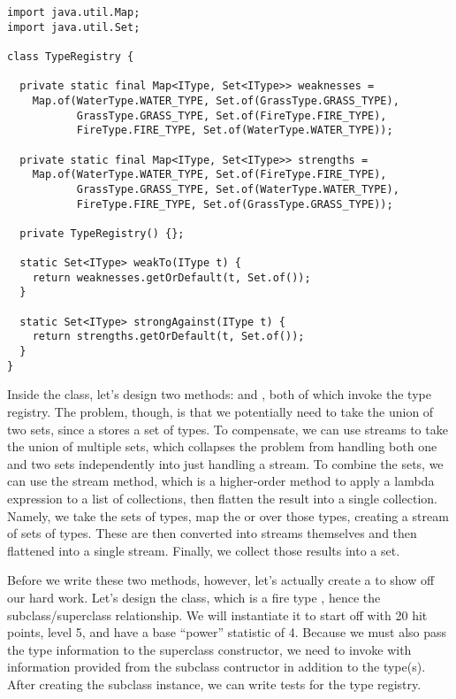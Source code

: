 \begin{lstlisting}[language=MyJava]
import java.util.Map;
import java.util.Set;

class TypeRegistry {

  private static final Map<IType, Set<IType>> weaknesses =
    Map.of(WaterType.WATER_TYPE, Set.of(GrassType.GRASS_TYPE),
           GrassType.GRASS_TYPE, Set.of(FireType.FIRE_TYPE),
           FireType.FIRE_TYPE, Set.of(WaterType.WATER_TYPE));

  private static final Map<IType, Set<IType>> strengths =
    Map.of(WaterType.WATER_TYPE, Set.of(FireType.FIRE_TYPE),
           GrassType.GRASS_TYPE, Set.of(WaterType.WATER_TYPE),
           FireType.FIRE_TYPE, Set.of(GrassType.GRASS_TYPE));

  private TypeRegistry() {};

  static Set<IType> weakTo(IType t) {
    return weaknesses.getOrDefault(t, Set.of());
  }

  static Set<IType> strongAgainst(IType t) {
    return strengths.getOrDefault(t, Set.of());
  }
}
\end{lstlisting}

Inside the  class, let's design two methods:  and , both of which invoke the type registry. The problem, though, is that we potentially need to take the union of two sets, since a  stores a set of types. To compensate, we can use streams to take the union of multiple sets, which collapses the problem from handling both one and two sets independently into just handling a stream. To combine the sets, we can use the  stream method, which is a higher-order method to apply a lambda expression to a list of collections, then flatten the result into a single collection. Namely, we take the sets of types, map the  or  over those types, creating a stream of sets of types. These are then converted into streams themselves and then flattened into a single stream. Finally, we collect those results into a set. 

Before we write these two methods, however, let's actually create a  to show off our hard work. Let's design the  class, which is a fire type , hence the subclass/superclass relationship. We will instantiate it to start off with 20 hit points, level 5, and have a base ``power'' statistic of 4. Because we must also pass the type information to the superclass constructor, we need to invoke  with information provided from the subclass contructor in addition to the type(s). After creating the subclass instance, we can write tests for the type registry. 

